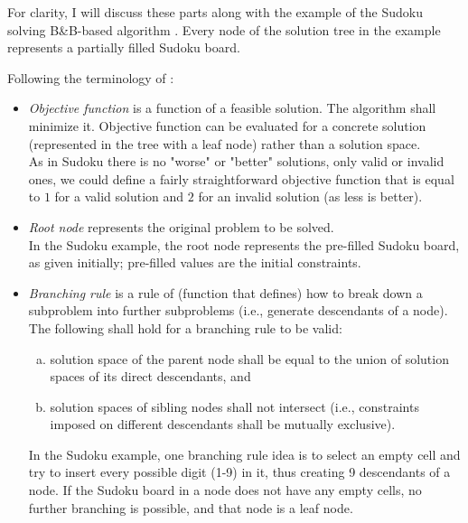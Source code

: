 For clarity, I will discuss these parts along with the example of the Sudoku solving
B\&B-based algorithm \cite{indriyono2024sudoku}. Every node of the solution tree
in the example represents a partially filled Sudoku board.

Following the terminology of \cite{clausen1999principles}:

\begin{itemize}
    \item \emph{Objective function} is a function of a feasible solution. The algorithm shall
        minimize it.
        Objective function can be evaluated for a concrete solution
        (represented in the tree with a leaf node) rather than a solution space. \\
        As in Sudoku there is no "worse" or "better" solutions, only valid or invalid ones,
        we could define a fairly straightforward objective function that is equal to
        $1$ for a valid solution and $2$ for an invalid solution (as less is better).

    \item \emph{Root node} represents the original problem to be solved. \\
        In the Sudoku example,
        the root node represents the pre-filled Sudoku board, as given initially;
        pre-filled values are the initial constraints.

    \item \emph{Branching rule} is a rule of (function that defines) how to break down a subproblem
        into further subproblems (i.e., generate descendants of a node). \\
        The following shall hold for a branching rule to be valid:
        \begin{enumerate}[(a)]
        \item solution space of the parent node shall be equal to the union of solution spaces of its
            direct descendants, and
        \item solution spaces of sibling nodes shall not intersect (i.e.,
            constraints imposed on different descendants shall be mutually exclusive).
        \end{enumerate}

        In the Sudoku example, one branching rule idea is to select an empty cell
        and try to insert every possible digit (1-9) in it, thus creating 9 descendants of a node.
        If the Sudoku board in a node does not have any empty cells, no further branching is possible,
        and that node is a leaf node.


\end{itemize}
